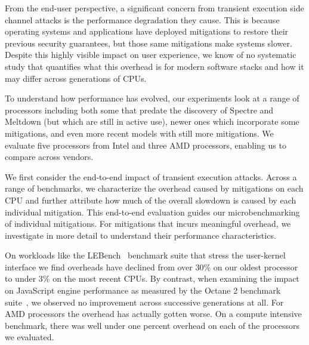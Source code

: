 
From the end-user perspective, a significant concern from transient execution side channel attacks is the performance degradation they cause.
This is because operating systems and applications have deployed mitigations to restore their previous security guarantees, but those same mitigations make systems slower.
Despite this highly visible impact on user experience, we know of no systematic study that quantifies what this overhead is for modern software stacks and how it may differ across generations of CPUs.

To understand how performance has evolved, our experiments look at a range of processors including both some that predate the discovery of Spectre and Meltdown (but which are still in active use), newer ones which incorporate some mitigations, and even more recent models with still more mitigations.
We evaluate five processors from Intel and three AMD processors, enabling us to compare across vendors.

We first consider the end-to-end impact of transient execution attacks.
Across a range of benchmarks, we characterize the overhead caused by mitigations on each CPU and further attribute how much of the overall slowdown is caused by each individual mitigation.
This end-to-end evaluation guides our microbenchmarking of individual mitigations.
For mitigations that incurs meaningful overhead, we investigate in more detail to understand their performance characteristics.

On workloads like the LEBench~\cite{ren:lebench} benchmark suite that stress the user-kernel interface we find overheads have declined from over 30\% on our oldest processor to under 3\% on the most recent CPUs.
By contrast, when examining the impact on JavaScript engine performance as measured by the Octane 2 benchmark suite~\cite{google:octane2}, we observed no improvement across successive generations at all.
For AMD processors the overhead has actually gotten worse.
On a compute intensive benchmark, there was well under one percent overhead on each of the processors we evaluated.


